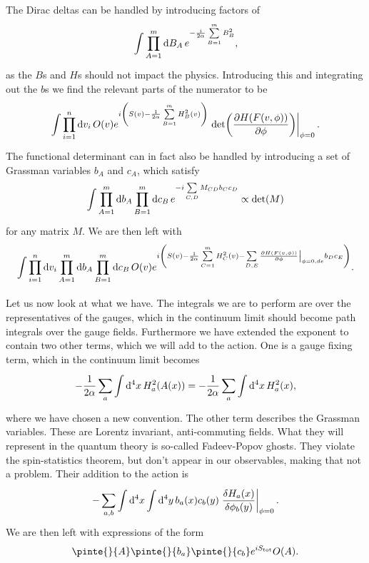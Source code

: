 The Dirac deltas can be handled by introducing factors of
\begin{align*}
\int\limits_{}^{}\prod\limits_{A = 1}^{m}\dd{B_{A}}e^{-\frac{i}{2\alpha}\sum\limits_{B = 1}^{m}B_{B}^{2}},
\end{align*}
as the $B$s and $H$s should not impact the physics. Introducing this and integrating out the $b$s we find the relevant parts of the numerator to be
\begin{align*}
\inte{}{}\prod\limits_{i = 1}^{n}\dd{v_{i}}O(v)e^{i\left(S(v) - \frac{1}{2\alpha}\sum\limits_{B = 1}^{m}H_{B}^{2}(v)\right)}\eval{\det(\pdv{H(F(v, \phi))}{\phi})}_{\phi = 0}.
\end{align*}
The functional determinant can in fact also be handled by introducing a set of Grassman variables $b_{A}$ and $c_{A}$, which satisfy
\begin{align*}
\int\limits_{}^{}\prod\limits_{A = 1}^{m}\dd{b_{A}}\prod\limits_{B = 1}^{m}\dd{c_{B}}e^{-i\sum\limits_{C, D} M_{CD}b_{C}c_{D}} \propto \det(M)
\end{align*}
for any matrix $M$. We are then left with
\begin{align*}
\inte{}{}\prod\limits_{i = 1}^{n}\dd{v_{i}}\prod\limits_{A = 1}^{m}\dd{b_{A}}\prod\limits_{B = 1}^{m}\dd{c_{B}}O(v)e^{i\left(S(v) - \frac{1}{2\alpha}\sum\limits_{C = 1}^{m}H_{C}^{2}(v) - \sum\limits_{D, E} \eval{\pdv{H(F(v, \phi))}{\phi}}_{\phi = 0, de}b_{D}c_{E}\right)}.
\end{align*}

Let us now look at what we have. The integrals we are to perform are over the representatives of the gauges, which in the continuum limit should become path integrals over the gauge fields. Furthermore we have extended the exponent to contain two other terms, which we will add to the action. One is a gauge fixing term, which in the continuum limit becomes
\begin{align*}
-\frac{1}{2\alpha}\sum\limits_{a}\int\limits_{}^{}\dd[4]{x}H_{a}^{2}(A(x)) = -\frac{1}{2\alpha}\sum\limits_{a}\int\limits_{}^{}\dd[4]{x}H_{a}^{2}(x),
\end{align*}
where we have chosen a new convention. The other term describes the Grassman variables. These are Lorentz invariant, anti-commuting fields. What they will represent in the quantum theory is so-called Fadeev-Popov ghosts. They violate the spin-statistics theorem, but don't appear in our observables, making that not a problem. Their addition to the action is
\begin{align*}
	-\sum\limits_{a, b}\integ[4]{}{}{x}{\integ[4]{}{}{y}{b_{a}(x)c_{b}(y)\eval{\fdv{H_{a}(x)}{\phi_{b}(y)}}_{\phi = 0}}}.
\end{align*}
We are then left with expressions of the form
\begin{align*}
	\pinte{}{A}\pinte{}{b_{a}}\pinte{}{c_{b}}e^{iS_{\text{tot}}}O(A).
\end{align*}

